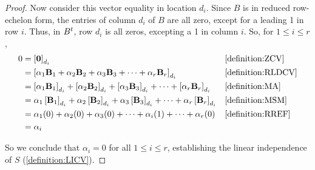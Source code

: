 \documentclass{ximera}
\begin{document}
\begin{theorem}
\begin{proof}
    Now consider this vector equality in location $d_i$.  Since $B$ is
    in reduced row-echelon form, the entries of column $d_i$ of $B$
    are all zero, except for a leading 1 in row $i$.  Thus, in
    $B^{t}$, row $d_i$ is all zeros, excepting a 1 in column
    $i$.  So, for $1\leq i\leq r$,
    \begin{align*}
      0
      &=\left\lbrack\mathbf{0}\right\rbrack_{d_i}&&\ref{definition:ZCV}\\
      &=\left\lbrack\alpha_{1}\mathbf{B}_{1}+\alpha_{2}\mathbf{B}_{2}+\alpha_{3}\mathbf{B}_{3}+\cdots +\alpha_{r}\mathbf{B}_{r}\right\rbrack_{d_i}
                                      &&\ref{definition:RLDCV}\\
      &=
        \left\lbrack\alpha_1\mathbf{B}_1\right\rbrack_{d_i}+
        \left\lbrack\alpha_2\mathbf{B}_2\right\rbrack_{d_i}+
        \left\lbrack\alpha_3\mathbf{B}_3\right\rbrack_{d_i}+
        \cdots+
        \left\lbrack\alpha_r\mathbf{B}_r\right\rbrack_{d_i}
                                      &&\ref{definition:MA}\\
      &=
        \alpha_1\left\lbrack\mathbf{B}_1\right\rbrack_{d_i}+
        \alpha_2\left\lbrack\mathbf{B}_2\right\rbrack_{d_i}+
        \alpha_3\left\lbrack\mathbf{B}_3\right\rbrack_{d_i}+
        \cdots+
        \alpha_r\left\lbrack\mathbf{B}_r\right\rbrack_{d_i}
                                      &&\ref{definition:MSM}\\
      &=
        \alpha_1(0)+
        \alpha_2(0)+
        \alpha_3(0)+
        \cdots+
        \alpha_i(1)+
        \cdots+
        \alpha_r(0)
                                      &&\ref{definition:RREF}\\
      &=\alpha_i
    \end{align*}

    So we conclude that $\alpha_i=0$ for all $1\leq i\leq r$,
    establishing the linear independence of $S$
    (\ref{definition:LICV}).
  \end{proof}
\end{theorem}
\end{document}
